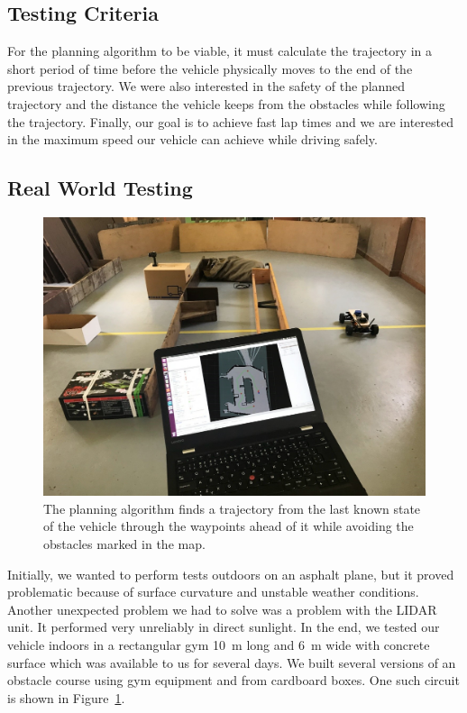 \subsection{Testing Criteria}
For the planning algorithm to be viable, it must calculate the trajectory in a short period of time before the vehicle physically moves to the end of the previous trajectory. We were also interested in the safety of the planned trajectory and the distance the vehicle keeps from the obstacles while following the trajectory. Finally, our goal is to achieve fast lap times and we are interested in the maximum speed our vehicle can achieve while driving safely.

\subsection{Real World Testing}

\begin{figure}
	\label{fig:real-world-testing-still}
	\centering
	\includegraphics[width=\textwidth]{../img/experiments/real-world-still.jpg}
	\caption{The planning algorithm finds a trajectory from the last known state of the vehicle through the waypoints ahead of it while avoiding the obstacles marked in the map.}
\end{figure}


Initially, we wanted to perform tests outdoors on an asphalt plane, but it proved problematic because of surface curvature and unstable weather conditions. Another unexpected problem we had to solve was a problem with the \gls*{LIDAR} unit. It performed very unreliably in direct sunlight. In the end, we tested our vehicle indoors in a rectangular gym \SI{10}{\meter} long and \SI{6}{\meter} wide with concrete surface which was available to us for several days. We built several versions of an obstacle course using gym equipment and from cardboard boxes. One such circuit is shown in Figure~\ref{fig:real-world-testing-still}.

